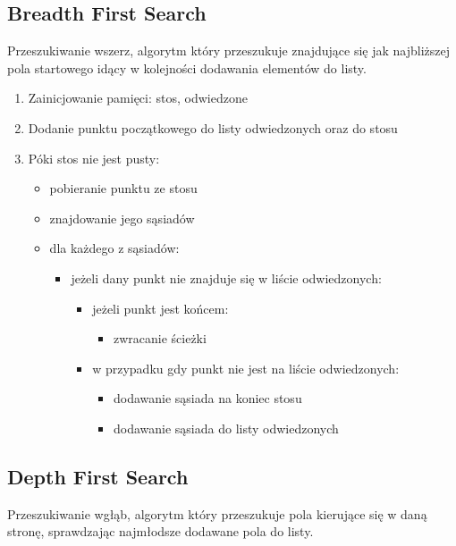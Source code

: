 \documentclass{article}
\begin{document}
\subsection{Breadth First Search}
Przeszukiwanie wszerz, algorytm który przeszukuje znajdujące się jak najbliższej pola startowego idący w kolejności dodawania elementów do listy.
\begin{enumerate}
\item Zainicjowanie pamięci: stos, odwiedzone
\item Dodanie punktu początkowego do listy odwiedzonych oraz do stosu
\item Póki stos nie jest pusty:
	\begin{itemize}
	\item pobieranie punktu ze stosu
	\item znajdowanie jego sąsiadów
	\item dla każdego z sąsiadów:
	\begin{itemize}
		\item jeżeli dany punkt nie znajduje się w liście odwiedzonych:
			\begin{itemize}
			\item jeżeli punkt jest końcem:
				\begin{itemize}
				\item zwracanie ścieżki
				\end{itemize}
			\item w przypadku gdy punkt nie jest na liście odwiedzonych:
				\begin{itemize}
				\item dodawanie sąsiada na koniec stosu
				\item dodawanie sąsiada do listy odwiedzonych				
				\end{itemize}
			\end{itemize}
		\end{itemize}		
	\end{itemize}
\end{enumerate}

\subsection{Depth First Search}
Przeszukiwanie wgłąb, algorytm który przeszukuje pola kierujące się w daną stronę, sprawdzając najmłodsze dodawane pola do listy.
\end{document}
